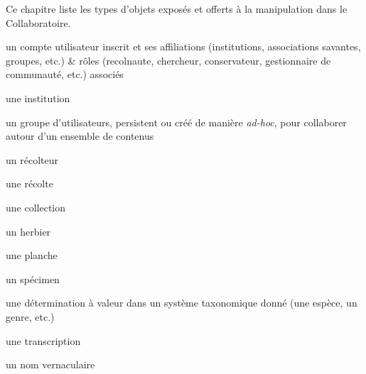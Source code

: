\startchapter[title={Les types d'entités ReColNat(+)},reference=c:entites]

Ce chapitre liste les types d'objets exposés et offerts à la manipulation dans le Collaboratoire.

\startsection[title={Identification des entités d'intérêt}]

\startsubsection[title={Entités sociales}]

\startitemize
	\item un compte utilisateur inscrit et ses affiliations (institutions, associations savantes, groupes, etc.) & rôles (recolnaute, chercheur, conservateur, gestionnaire de communauté, etc.) associés
	\item une institution
	\item un groupe d'utilisateurs, persistent ou créé de manière {\it ad-hoc}, pour collaborer autour d'un ensemble de contenus
\stopitemize

\startsubsection[title={Entités scientifiques},reference=c:entites:scientifiques]

\startitemize
	\item un récolteur
	\item une récolte
	\item une collection
	\item un herbier
	\item une planche
	\item un spécimen
	\item une détermination à valeur dans un système taxonomique donné (une espèce, un genre, etc.)
	\item une transcription
	\item un nom vernaculaire
\stopitemize

